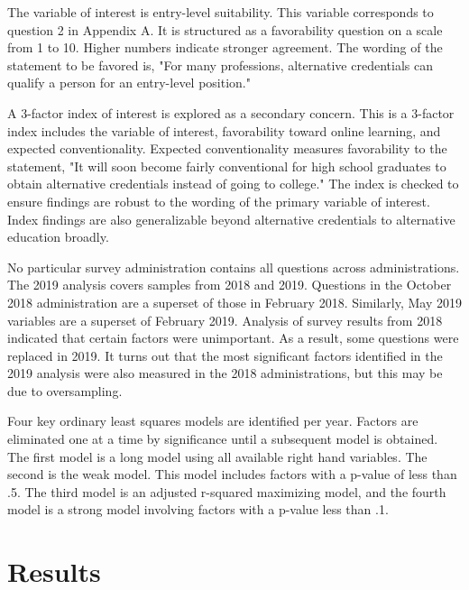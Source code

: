 \documentclass[review]{elsarticle}
\begin{document}
        The variable of interest is entry-level suitability.
        This variable corresponds to question 2 in Appendix A.
        It is structured as a favorability question on a scale from 1 to 10. Higher numbers indicate
        stronger agreement.
        The wording of the statement to be favored is,
        "For many professions, alternative credentials can qualify a person for an entry-level position."
        
        A 3-factor index of interest is explored as a secondary concern.
        This is a 3-factor index includes the variable of interest, favorability toward online learning,
        and expected conventionality.
        Expected conventionality measures favorability to the statement,
        "It will soon become fairly conventional for high school graduates to obtain alternative credentials
        instead of going to college."
        The index is checked to ensure findings are robust to the wording of the primary variable of interest.
        Index findings are also generalizable beyond alternative credentials to alternative education broadly.

        No particular survey administration contains all questions across administrations.
        The 2019 analysis covers samples from 2018 and 2019.
        Questions in the October 2018 administration are a superset of those in February 2018.
        Similarly, May 2019 variables are a superset of February 2019.
        Analysis of survey results from 2018 indicated that certain factors were unimportant.
        As a result, some questions were replaced in 2019.
        It turns out that the most significant factors identified in the
        2019 analysis were also measured in the 2018 administrations, but this may be due to oversampling.
        
        Four key ordinary least squares models are identified per year.
        Factors are eliminated one at a time by significance until a subsequent model is obtained.
        The first model is a long model using all available right hand variables.
        The second is the weak model. This model includes factors with a p-value of less than .5.
        The third model is an adjusted r-squared maximizing model, and the fourth
        model is a strong model involving factors with a p-value less than .1.

        \section{Results}
\end{document}
